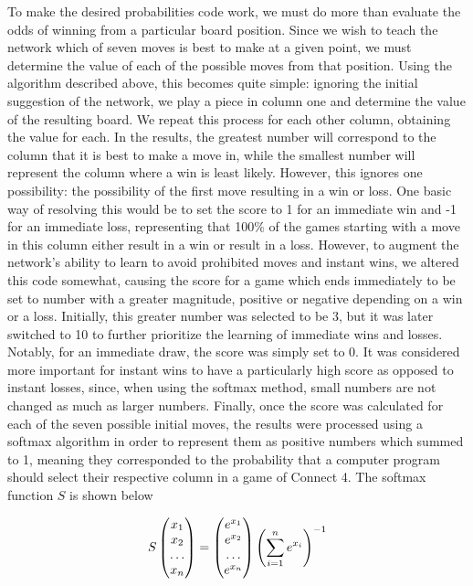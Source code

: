 \documentclass[12pt]{article}
\begin{document}
To make the desired probabilities code work, we must do more than evaluate the odds of winning from a particular board position. Since we wish to teach the network which of seven moves is best to make at a given point, we must determine the value of each of the possible moves from that position. Using the algorithm described above, this becomes quite simple: ignoring the initial suggestion of the network, we play a piece in column one and determine the value of the resulting board. We repeat this process for each other column, obtaining the value for each. In the results, the greatest number will correspond to the column that it is best to make a move in, while the smallest number will represent the column where a win is least likely. However, this ignores one possibility: the possibility of the first move resulting in a win or loss. One basic way of resolving this would be to set the score to 1 for an immediate win and -1 for an immediate loss, representing that 100\% of the games starting with a move in this column either result in a win or result in a loss. However, to augment the network's ability to learn to avoid prohibited moves and instant wins, we altered this code somewhat, causing the score for a game which ends immediately to be set to number with a greater magnitude, positive or negative depending on a win or a loss. Initially, this greater number was selected to be 3, but it was later switched to 10 to further prioritize the learning of immediate wins and losses. Notably, for an immediate draw, the score was simply set to 0. It was considered more important for instant wins to have a particularly high score as opposed to instant losses, since, when using the softmax method, small numbers are not changed as much as larger numbers. Finally, once the score was calculated for each of the seven possible initial moves, the results were processed using a softmax algorithm in order to represent them as positive numbers which summed to 1, meaning they corresponded to the probability that a computer program should select their respective column in a game of Connect 4. The softmax function $S$ is shown below

\begin{align*}
S\begin{pmatrix}x_1 \\ x_2 \\ \dots \\x_n\end{pmatrix} = \begin{pmatrix}e^{x_1} \\ e^{x_2} \\ \dots \\ e^{x_n}\end{pmatrix}\left(\sum_{i=1}^{n}e^{x_i}\right)^{-1}
\end{align*}
\end{document}
